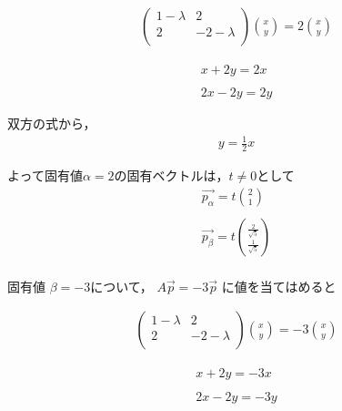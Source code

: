 \documentclass[dvipdfmx,autodetect-engine,titlepage]{jsarticle}
\begin{document}
\begin{eqnarray*}
  \begin{pmatrix}
    1-\lambda  & 2 \\
    2 & -2-\lambda  \\
  \end{pmatrix} 
  \binom{x}{y} 
  = 2\binom{x}{y} 
\end{eqnarray*}

\begin{eqnarray*}
  x +2y = 2x \\\\
  2x -2y =2y
\end{eqnarray*}

双方の式から，\begin{eqnarray*}
  y= \frac{1}{2} x
\end{eqnarray*}

よって固有値\begin{math}
  \alpha = 2
\end{math}の固有ベクトルは，\begin{math}
  t \neq 0
\end{math}として
\begin{eqnarray*}
  \overrightarrow{p_{\alpha }} = t \binom{2}{1} \\\\
  \overrightarrow{p_{\beta }} = t \binom{\frac{2}{\sqrt{5} } }{\frac{1}{\sqrt{5}} } \\
\end{eqnarray*}


固有値 \begin{math}
  \beta  = -3
\end{math}について，
\begin{math}
A \overrightarrow{p} = -3 \overrightarrow{p} 
\end{math} に値を当てはめると

\begin{eqnarray*}
  \begin{pmatrix}
    1-\lambda  & 2 \\
    2 & -2-\lambda  \\
  \end{pmatrix} 
  \binom{x}{y} 
  = -3\binom{x}{y} 
\end{eqnarray*}

\begin{eqnarray*}
  x +2y = -3x \\\\
  2x -2y =-3y
\end{eqnarray*}
\end{document}
